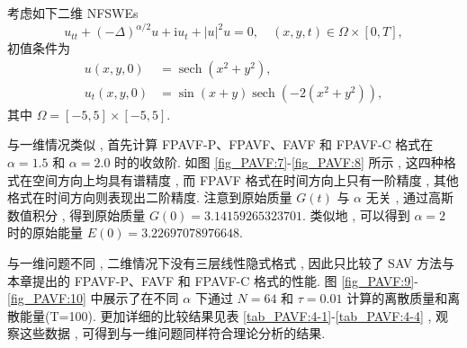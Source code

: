 	\begin{example}\label{exp_PAVF:4}

			考虑如下二维 NFSWEs
	\begin{equation}
		u_{t t}+(-\Delta)^{\alpha / 2} u+\mathrm{i}  u_{t}+|u|^{2} u=0 , \quad (x , y , t) \in \Omega \times[0 , T],
	\end{equation}
	初值条件为
	\begin{equation}
		\begin{aligned}
			u(x , y , 0)&=\operatorname{sech}\left(x^2+y^2\right) , \\
			u_t(x , y , 0)&=\sin (x+y) \operatorname{sech}\left(-2\left(x^2+y^2\right)\right)  , 
		\end{aligned}
	\end{equation}
	其中 $\Omega=[-5 , 5] \times[-5 , 5]$.
		
		\end{example}
	
	与一维情况类似 , 首先计算 FPAVF-P、FPAVF、FAVF 和 FPAVF-C 格式在 $\alpha=1.5$ 和 $\alpha=2.0$ 时的收敛阶.
	如图 \ref{fig_PAVF:7}-\ref{fig_PAVF:8} 所示 , 这四种格式在空间方向上均具有谱精度 , 而 FPAVF 格式在时间方向上只有一阶精度 , 其他格式在时间方向则表现出二阶精度.
	注意到原始质量 $G(t)$ 与 $\alpha$ 无关 , 通过高斯数值积分 , 得到原始质量 $G(0)=3.14159265323701$.
	类似地 , 可以得到 $\alpha=2$ 时的原始能量 $E(0)=3.22697078976648$.

	与一维问题不同 , 二维情况下没有三层线性隐式格式 , 因此只比较了 SAV 方法与本章提出的 FPAVF-P、FAVF 和 FPAVF-C 格式的性能.
	图 \ref{fig_PAVF:9}-\ref{fig_PAVF:10} 中展示了在不同 $\alpha$ 下通过 $N=64$ 和 $\tau=0.01$ 计算的离散质量和离散能量(T=100).
	更加详细的比较结果见表 \ref{tab_PAVF:4-1}-\ref{tab_PAVF:4-4} , 观察这些数据 , 可得到与一维问题同样符合理论分析的结果.

